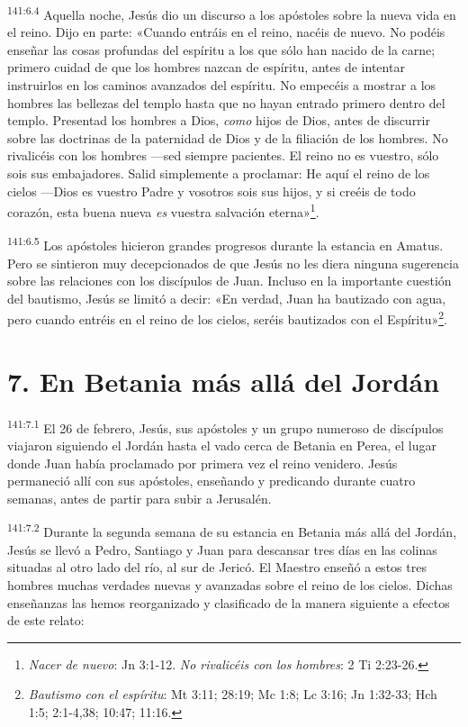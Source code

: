 \par 
\textsuperscript{141:6.4} Aquella noche, Jesús dio un discurso a los apóstoles sobre la nueva vida en el reino. Dijo en parte: «Cuando entráis en el reino, nacéis de nuevo. No podéis enseñar las cosas profundas del espíritu a los que sólo han nacido de la carne; primero cuidad de que los hombres nazcan de espíritu, antes de intentar instruirlos en los caminos avanzados del espíritu. No empecéis a mostrar a los hombres las bellezas del templo hasta que no hayan entrado primero dentro del templo. Presentad los hombres a Dios, \textit{como} hijos de Dios, antes de discurrir sobre las doctrinas de la paternidad de Dios y de la filiación de los hombres. No rivalicéis con los hombres ---sed siempre pacientes. El reino no es vuestro, sólo sois sus embajadores. Salid simplemente a proclamar: He aquí el reino de los cielos ---Dios es vuestro Padre y vosotros sois sus hijos, y si creéis de todo corazón, esta buena nueva \textit{es} vuestra salvación eterna»\footnote{\textit{Nacer de nuevo}: Jn 3:1-12. \textit{No rivalicéis con los hombres}: 2 Ti 2:23-26.}.

\par 
\textsuperscript{141:6.5} Los apóstoles hicieron grandes progresos durante la estancia en Amatus. Pero se sintieron muy decepcionados de que Jesús no les diera ninguna sugerencia sobre las relaciones con los discípulos de Juan. Incluso en la importante cuestión del bautismo, Jesús se limitó a decir: «En verdad, Juan ha bautizado con agua, pero cuando entréis en el reino de los cielos, seréis bautizados con el Espíritu»\footnote{\textit{Bautismo con el espíritu}: Mt 3:11; 28:19; Mc 1:8; Lc 3:16; Jn 1:32-33; Hch 1:5; 2:1-4,38; 10:47; 11:16.}.

\section*{7. En Betania más allá del Jordán}
\par 
\textsuperscript{141:7.1} El 26 de febrero, Jesús, sus apóstoles y un grupo numeroso de discípulos viajaron siguiendo el Jordán hasta el vado cerca de Betania en Perea, el lugar donde Juan había proclamado por primera vez el reino venidero. Jesús permaneció allí con sus apóstoles, enseñando y predicando durante cuatro semanas, antes de partir para subir a Jerusalén.

\par 
\textsuperscript{141:7.2} Durante la segunda semana de su estancia en Betania más allá del Jordán, Jesús se llevó a Pedro, Santiago y Juan para descansar tres días en las colinas situadas al otro lado del río, al sur de Jericó. El Maestro enseñó a estos tres hombres muchas verdades nuevas y avanzadas sobre el reino de los cielos. Dichas enseñanzas las hemos reorganizado y clasificado de la manera siguiente a efectos de este relato:

